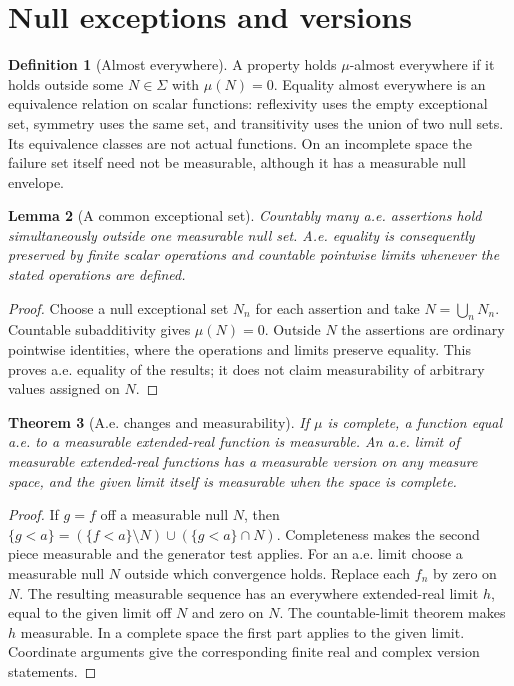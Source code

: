 \documentclass[11pt,oneside,openany]{book}
\newtheorem{theorem}{Theorem}[chapter]
\newtheorem{lemma}[theorem]{Lemma}
\theoremstyle{definition}
\newtheorem{definition}[theorem]{Definition}
\theoremstyle{remark}
\newcommand{\family}[1]{}
\begin{document}
\section{Null exceptions and versions}

\begin{definition}[Almost everywhere]
\family{D11.04.almost_everywhere}\label{d11:04:almost-everywhere}
A property holds $\mu$-almost everywhere if it holds outside some
$N\in\Sigma$ with $\mu(N)=0$. Equality almost everywhere is an equivalence
relation on scalar functions: reflexivity uses the empty exceptional set,
symmetry uses the same set, and transitivity uses the union of two null sets.
Its equivalence classes are not actual functions. On an incomplete space the
failure set itself need not be measurable, although it has a measurable null
envelope.
\end{definition}

\begin{lemma}[A common exceptional set]
\family{D11.04.common_exceptional_set}\label{d11:04:common-exceptional-set}
Countably many a.e. assertions hold simultaneously outside one measurable
null set. A.e. equality is consequently preserved by finite scalar operations
and countable pointwise limits whenever the stated operations are defined.
\end{lemma}
\begin{proof}
Choose a null exceptional set $N_n$ for each assertion and take
$N=\bigcup_nN_n$. Countable subadditivity gives $\mu(N)=0$.
Outside $N$ the assertions are ordinary pointwise identities, where the
operations and limits preserve equality. This proves a.e. equality of the
results; it does not claim measurability of arbitrary values assigned on $N$.
\end{proof}

\begin{theorem}[A.e. changes and measurability]
\family{D11.04.ae_measurability_complete}\label{d11:04:ae-measurability-complete}
If $\mu$ is complete, a function equal a.e. to a measurable extended-real
function is measurable. An a.e. limit of measurable extended-real functions
has a measurable version on any measure space, and the given limit itself
is measurable when the space is complete.
\end{theorem}
\begin{proof}
If $g=f$ off a measurable null $N$, then
$\{g<a\}=(\{f<a\}\setminus N)\cup(\{g<a\}\cap N)$.
Completeness makes the second piece measurable and the generator test applies.
For an a.e. limit choose a measurable null $N$ outside which convergence
holds. Replace each $f_n$ by zero on $N$. The resulting measurable sequence
has an everywhere extended-real limit $h$, equal to the given limit off $N$
and zero on $N$. The countable-limit theorem makes $h$ measurable.
In a complete space the first part applies to the given limit. Coordinate
arguments give the corresponding finite real and complex version statements.
\end{proof}
\end{document}
